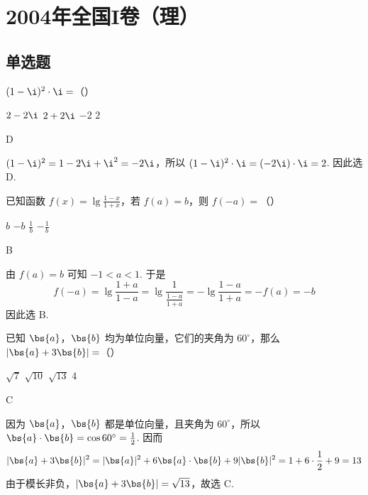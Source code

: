 \chapter{2004年全国I卷（理）}
\section{单选题}
\begin{problem}
\((1 - \i)^{2}\cdot \i=\)（\quad）

\choices
    {\(2 - 2\i\)}
    {\(2 + 2\i\)}
    {\(-2\)}
    {\(2\)}
\end{problem}

\begin{answer}
D
\end{answer}

\begin{solution}
\((1-\i)^2=1-2\i+\i^2=-2\i\)，所以 \((1-\i)^2\cdot\i=(-2\i)\cdot\i=2\). 因此选 D.
\end{solution}

\begin{problem}
已知函数 \(f(x)=\lg \frac{1 - x}{1 + x}\)，若 \(f(a)=b\)，则 \(f(-a)=\)（\quad）

\choices
    {\(b\)}
    {\(-b\)}
    {\( \frac{1}{b} \)}
    {\(-\frac{1}{b}\)}
\end{problem}

\begin{answer}
B
\end{answer}

\begin{solution}
由 \(f(a)=b\) 可知 \(-1<a<1\). 于是
\[
f(-a)=\lg\frac{1+a}{1-a}=\lg\frac{1}{\frac{1-a}{1+a}}=-\lg\frac{1-a}{1+a}=-f(a)=-b
\]
因此选 B.
\end{solution}

\begin{problem}
已知 \(\bs{a}\)，\(\bs{b}\) 均为单位向量，它们的夹角为 \(60^{\circ}\)，那么 \(|\bs{a} + 3\bs{b}| =\)（\quad）

\choices
    {\(\sqrt{7}\)}
    {\(\sqrt{10}\)}
    {\(\sqrt{13}\)}
    {\(4\)}
\end{problem}

\begin{answer}
C
\end{answer}

\begin{solution}
因为 \(\bs{a}\)，\(\bs{b}\) 都是单位向量，且夹角为 \(60^{\circ}\)，所以 \(\bs{a}\cdot\bs{b}=\cos60^{\circ}=\frac12\). 因而
\[
\lvert\bs{a}+3\bs{b}\rvert^2=\lvert\bs{a}\rvert^2+6\bs{a}\cdot\bs{b}+9\lvert\bs{b}\rvert^2=1+6\cdot\frac12+9=13
\]
由于模长非负，\(\lvert\bs{a}+3\bs{b}\rvert=\sqrt{13}\)，故选 C.
\end{solution}

